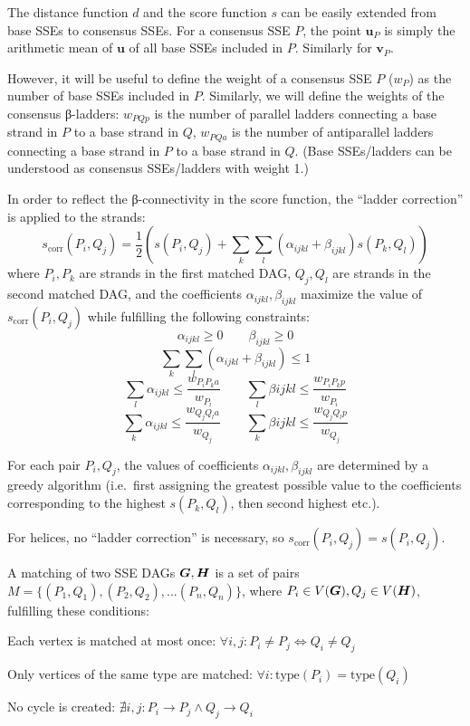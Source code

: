 \documentclass{article}
\begin{document}
The distance function \(d\) and the score function \(s\) can be easily 
extended from base SSEs to consensus SSEs. 
For a consensus SSE \(P\), the point \(\mathbf{u}_P\) is simply 
the arithmetic mean of \(\mathbf{u}\) of all base SSEs included in \(P\).
Similarly for \(\mathbf{v}_P\).

However, it will be useful to define the weight of a consensus SSE \(P\) (\(w_P\)) 
as the number of base SSEs included in \(P\).
Similarly, we will define the weights of the consensus β-ladders:
\(w_{PQp}\) is the number of parallel ladders connecting 
a base strand in \(P\) to a base strand in \(Q\),
\(w_{PQa}\) is the number of antiparallel ladders connecting 
a base strand in \(P\) to a base strand in \(Q\). 
(Base SSEs/ladders can be understood as consensus SSEs/ladders with weight 1.)

In order to reflect the β-connectivity in the score function, 
the ``ladder correction'' is applied to the strands:
  \[  s_\mathrm{corr}(P_i, Q_j) = \frac{1}{2} \left( s(P_i, Q_j) + \sum_k \sum_l (\alpha_{ijkl} + \beta_{ijkl}) s(P_k, Q_l) \right)  \]
where \(P_i, P_k\) are strands in the first matched DAG, 
\(Q_j, Q_l\) are strands in the second matched DAG, 
and the coefficients \(\alpha_{ijkl}, \beta_{ijkl}\) 
maximize the value of \(s_\mathrm{corr}(P_i, Q_j)\)
while fulfilling the following constraints:
  \[  \alpha_{ijkl} \geq 0 \qquad  \beta_{ijkl} \geq 0  \]
  \[  \sum_k \sum_l (\alpha_{ijkl} + \beta_{ijkl}) \leq 1  \]
  \[  \sum_l \alpha_{ijkl} \leq \frac{w_{P_i P_k a}}{w_{P_i}}  \qquad  \sum_l \beta{ijkl} \leq \frac{w_{P_i P_k p}}{w_{P_i}}  \]
  \[  \sum_k \alpha_{ijkl} \leq \frac{w_{Q_j Q_l a}}{w_{Q_j}}  \qquad  \sum_k \beta{ijkl} \leq \frac{w_{Q_j Q_l p}}{w_{Q_j}}  \]

For each pair \(P_i, Q_j\), the values of coefficients \(\alpha_{ijkl}, \beta_{ijkl}\) 
are determined by a greedy algorithm (i.e.~first assigning the greatest possible value 
to the coefficients corresponding to the highest \(s(P_k, Q_l)\), then second highest etc.). 

For helices, no ``ladder correction'' is necessary, so \(s_\mathrm{corr}(P_i, Q_j) = s(P_i, Q_j)\).

A matching of two SSE DAGs \(\boldsymbol{G}, \boldsymbol{H}\) is a set of pairs 
\(M = \{(P_1, Q_1), (P_2, Q_2), ... (P_n, Q_n)\}\),
where \(P_i \in V(\boldsymbol{G}), Q_j \in V(\boldsymbol{H})\), fulfilling these conditions:

\begin{denseitemize}     
  \item Each vertex is matched at most once: \(\forall i, j: P_i \neq P_j \Leftrightarrow Q_i \neq Q_j\)
  \item Only vertices of the same type are matched: \(\forall i: \mathrm{type}(P_i) = \mathrm{type}(Q_i)\)
  \item No cycle is created: \(\nexists i, j: P_i \rightarrow P_j \wedge Q_j \rightarrow Q_i\)
\end{denseitemize}
\end{document}
